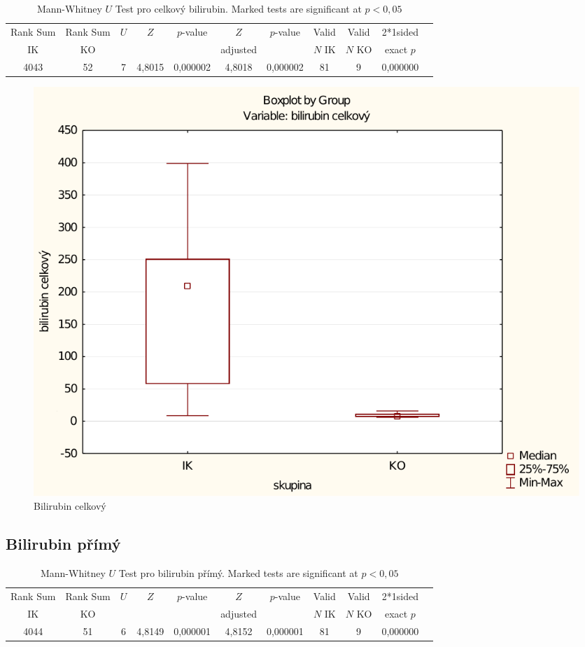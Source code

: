 \documentclass[12pt]{article}
\begin{document}
\begin{table}[h]
\begin{tabular}{|c|c|c|c|c|c|c|c|c|c|c|}
\hline
Rank Sum & Rank Sum & $U$ & $Z$ & $p$-value & $Z$ & $p$-value & Valid & Valid & 2*1sided \\
IK & KO & & & & adjusted & & $N$ IK & $N$ KO & exact $p$ \\
\hline
4043 & 52 & 7 & 4,8015 & 0,000002 & 4,8018 & 0,000002 & 81 & 9 & 0,000000 \\
\hline
\end{tabular}
\caption{Mann-Whitney $U$ Test pro celkový bilirubin. Marked tests are significant at $p < 0,05$}
\end{table}

\begin{figure}[ht!]
	\begin{centering}
	\includegraphics[width=\linewidth]{bilirubin-celkovy.pdf}
	\caption{Bilirubin celkový}
	\end{centering}
\end{figure}

\newpage

\subsection{Bilirubin přímý}

\begin{table}[h]
\begin{tabular}{|c|c|c|c|c|c|c|c|c|c|c|}
\hline
Rank Sum & Rank Sum & $U$ & $Z$ & $p$-value & $Z$ & $p$-value & Valid & Valid & 2*1sided \\
IK & KO & & & & adjusted & & $N$ IK & $N$ KO & exact $p$ \\
\hline
4044 & 51 & 6 & 4,8149 & 0,000001 & 4,8152 & 0,000001 & 81 & 9 & 0,000000 \\

\hline
\end{tabular}
\caption{Mann-Whitney $U$ Test pro bilirubin přímý. Marked tests are significant at $p < 0,05$}
\end{table}
\end{document}
